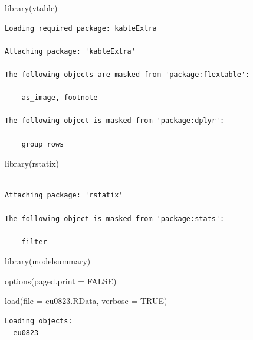 \documentclass[
  letterpaper,
  DIV=11,
  numbers=noendperiod]{scrartcl}
\newenvironment{Shaded}{\begin{snugshade}}{\end{snugshade}}
\newcommand{\AttributeTok}[1]{\textcolor[rgb]{0.40,0.45,0.13}{#1}}
\newcommand{\ConstantTok}[1]{\textcolor[rgb]{0.56,0.35,0.01}{#1}}
\newcommand{\FunctionTok}[1]{\textcolor[rgb]{0.28,0.35,0.67}{#1}}
\newcommand{\NormalTok}[1]{\textcolor[rgb]{0.00,0.23,0.31}{#1}}
\newcommand{\StringTok}[1]{\textcolor[rgb]{0.13,0.47,0.30}{#1}}
\begin{document}
\begin{Shaded}
\begin{Highlighting}[]
\FunctionTok{library}\NormalTok{(vtable)}
\end{Highlighting}
\end{Shaded}

\begin{verbatim}
Loading required package: kableExtra

Attaching package: 'kableExtra'

The following objects are masked from 'package:flextable':

    as_image, footnote

The following object is masked from 'package:dplyr':

    group_rows
\end{verbatim}

\begin{Shaded}
\begin{Highlighting}[]
\FunctionTok{library}\NormalTok{(rstatix)}
\end{Highlighting}
\end{Shaded}

\begin{verbatim}

Attaching package: 'rstatix'

The following object is masked from 'package:stats':

    filter
\end{verbatim}

\begin{Shaded}
\begin{Highlighting}[]
\FunctionTok{library}\NormalTok{(modelsummary)}

\FunctionTok{options}\NormalTok{(}\AttributeTok{paged.print =} \ConstantTok{FALSE}\NormalTok{)}
\end{Highlighting}
\end{Shaded}

\begin{Shaded}
\begin{Highlighting}[]
\FunctionTok{load}\NormalTok{(}\AttributeTok{file =} \StringTok{\textquotesingle{}eu0823.RData\textquotesingle{}}\NormalTok{, }\AttributeTok{verbose =} \ConstantTok{TRUE}\NormalTok{)}
\end{Highlighting}
\end{Shaded}

\begin{verbatim}
Loading objects:
  eu0823
\end{verbatim}
\end{document}
